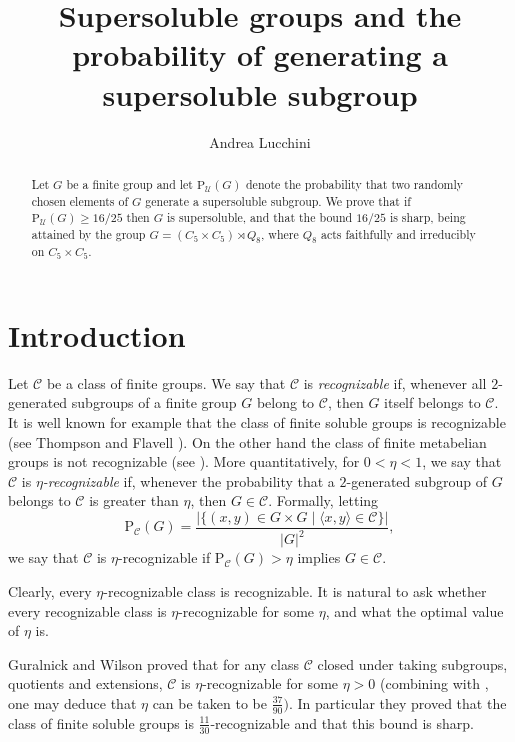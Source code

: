 \documentclass{amsart}
\title[Supersoluble groups]{Supersoluble groups and the probability of generating 
	a supersoluble subgroup}
\author{Andrea Lucchini}
\date{}
\newcommand{\Psu}{\mathrm{P}_{\mathcal{U}}}
\begin{document}
	\maketitle
	
	\begin{abstract}
		Let $G$ be a finite group and let $\Psu(G)$ denote the 
		probability that two randomly chosen elements of $G$ generate 
		a supersoluble subgroup. We prove that if $\Psu(G) \geq 16/25$ 
		then $G$ is supersoluble, and that the bound $16/25$ is sharp, 
		being attained by the group $G = (C_5 \times C_5) \rtimes Q_8$, 
		where $Q_8$ acts faithfully and irreducibly on $C_5 \times C_5$.
	\end{abstract}
	
	\section{Introduction}
	
	Let $\mathcal{C}$ be a class of finite groups. We say that 
	$\mathcal{C}$ is \textit{recognizable} if, whenever all 
	$2$-generated subgroups of a finite group $G$ belong to 
	$\mathcal{C}$, then $G$ itself belongs to $\mathcal{C}$. 
	It is well known for example that the class of finite soluble groups is recognizable (see Thompson \cite{th} and Flavell \cite{pf}). On the other hand the class of finite metabelian groups is not recognizable (see \cite[Example 7.1]{bln}).
	More quantitatively, for $0 < \eta < 1$, we say that 
	$\mathcal{C}$ is \textit{$\eta$-recognizable} if, whenever 
	the probability that a $2$-generated subgroup of $G$ belongs 
	to $\mathcal{C}$ is greater than $\eta$, then $G \in \mathcal{C}$. 
	Formally, letting
	$$\mathrm{P}_{\mathcal{C}}(G) = \frac{|\{(x,y) \in G \times G 
		\mid \langle x,y\rangle \in \mathcal{C}\}|}{|G|^2},$$
	we say that $\mathcal{C}$ is $\eta$-recognizable if 
	$\mathrm{P}_{\mathcal{C}}(G) > \eta$ implies $G \in \mathcal{C}$.
	
	Clearly, every $\eta$-recognizable class is recognizable. 
	It is natural to ask whether every recognizable class 
	is $\eta$-recognizable for some $\eta$, and what the optimal 
	value of $\eta$ is.
	
	Guralnick and Wilson \cite{GW00} proved that for any class 
	$\mathcal{C}$ closed under taking subgroups, quotients and 
	extensions, $\mathcal{C}$ is $\eta$-recognizable for some 
	$\eta > 0$ (combining \cite[Proposition 5]{mqrd} with \cite[Theorem
	1.1]{mqrd}, one may deduce that $\eta$ can be taken to be $\frac{37}{90})$.
	In particular they proved that the class 
	of finite soluble groups is $\frac{11}{30}$-recognizable
	and that this bound is sharp. 
	
\end{document}
